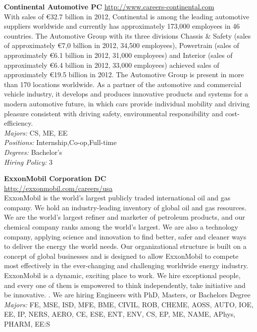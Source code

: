 \documentclass[twoside]{article}
\begin{document}
\begin{center}
\begin{multicols}{2}
\begin{minipage}{.95\columnwidth}{\Large\bf Continental Automotive \hfill PC}
    \url{http://www.careers-continental.com}\\
    With sales of €32.7 billion in 2012, Continental is among the leading automotive suppliers worldwide and currently has approximately 173,000 employees in 46 countries. The Automotive Group with its three divisions Chassis \& Safety (sales of approximately €7,0 billion in 2012, 34,500 employees), Powertrain (sales of approximately €6.1 billion in 2012, 31,000 employees) and Interior (sales of approximately €6.4 billion in 2012, 33,000 employees) achieved sales of approximately €19.5 billion in 2012. The Automotive Group is present in more than 170 locations worldwide. As a partner of the automotive and commercial vehicle industry, it develops and produces innovative products and systems for a modern automotive future, in which cars provide individual mobility and driving pleasure consistent with driving safety, environmental responsibility and cost-efficiency.\\
    \emph{Majors:} CS, ME, EE\\
    \emph{Positions:} Internship,Co-op,Full-time\\
    \emph{Degrees:} Bachelor's\\
    \emph{Hiring Policy:} 3\\
\end{minipage}
 \begin{minipage}{.95\columnwidth}{\Large\bf ExxonMobil Corporation \hfill DC}\\
    \url{http://exxonmobil.com/careers/usa}\\
    ExxonMobil is the world’s largest publicly traded international oil and gas company. We hold an industry-leading inventory of global oil and gas resources. We are the world’s largest refiner and marketer of petroleum products, and our chemical company ranks among the world’s largest. We are also a technology company, applying science and innovation to find better, safer and cleaner ways to deliver the energy the world needs. Our organizational structure is built on a concept of global businesses and is designed to allow ExxonMobil to compete most effectively in the ever-changing and challenging worldwide energy industry. ExxonMobil is a dynamic, exciting place to work. We hire exceptional people, and every one of them is empowered to think independently, take initiative and be innovative. . We are hiring Engineers with PhD, Masters, or Bachelors Degree\\
    \emph{Majors:} FE, MSE, ISD, MFE, BME, CIVIL, ROB, CHEME, AOSS, AUTO, IOE, EE, IP, NERS, AERO, CE, ESE, ENT, ENV, CS, EP, ME, NAME, APhys, PHARM, EE:S\\

\end{minipage}
\end{multicols}
\end{center}
\end{document}

